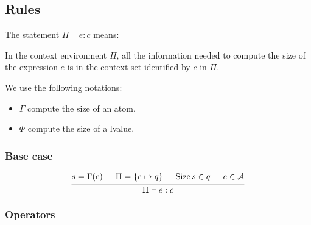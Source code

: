 \documentclass{article}
\DeclareMathOperator{\Size}{Size}
\begin{document}
\subsection*{Rules}
The statement $\Pi \vdash e : c$ means:
\begin{center}
    In the context environment $\Pi$, all the information needed to compute the size of the expression $e$ is in the context-set identified by $c$ in $\Pi$.
\end{center}


We use the following notations:
\begin{itemize}
    \item $\Gamma$ compute the size of an atom.
    \item $\Phi$ compute the size of a lvalue.
\end{itemize}


\subsubsection*{Base case}

\begin{equation*}
    \begin{prooftree}
        \hypo{s = \Gamma(e)}
        \hypo{\Pi = \left\{c \mapsto q\right\}}
        \hypo{\Size s \in q}
        \hypo{e \in \mathcal{A}}
        \infer4{\Pi\vdash e: c}
    \end{prooftree}
\end{equation*}

\subsubsection*{Operators}
\end{document}
